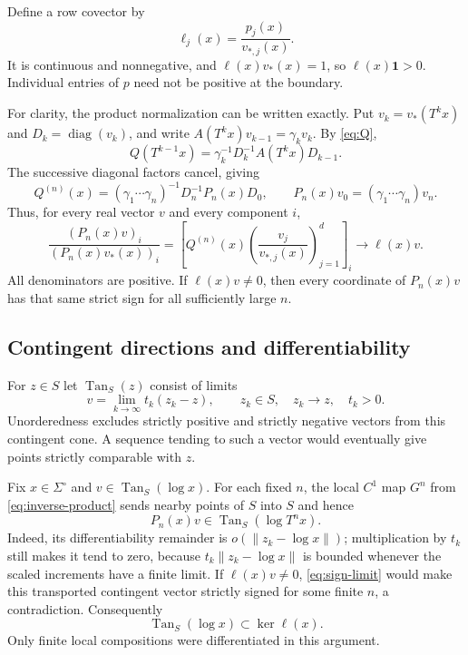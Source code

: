 \documentclass[11pt]{article}
\newcommand{\one}{\mathbf 1}
\newcommand{\diag}{\operatorname{diag}}
\newcommand{\Tan}{\operatorname{Tan}}
\begin{document}
Define a row covector by
\begin{equation}\label{eq:ell}
 \ell_j(x)=\frac{p_j(x)}{v_{*,j}(x)}.
\end{equation}
It is continuous and nonnegative, and
$\ell(x)v_*(x)=1$, so $\ell(x)\one>0$. Individual entries of $p$ need
not be positive at the boundary.

For clarity, the product normalization can be written exactly. Put
$v_k=v_*(T^kx)$ and $D_k=\diag(v_k)$, and write
$A(T^kx)v_{k-1}=\gamma_k v_k$. By \eqref{eq:Q},
\[
 Q(T^{k-1}x)=\gamma_k^{-1}D_k^{-1}A(T^kx)D_{k-1}.
\]
The successive diagonal factors cancel, giving
\[
 Q^{(n)}(x)=(\gamma_1\cdots\gamma_n)^{-1}
             D_n^{-1}P_n(x)D_0,
 \qquad P_n(x)v_0=(\gamma_1\cdots\gamma_n)v_n.
\]
Thus, for every real vector $v$ and every component $i$,
\begin{equation}\label{eq:sign-limit}
 \frac{(P_n(x)v)_i}{(P_n(x)v_*(x))_i}
 =\left[Q^{(n)}(x)
       \left(\frac{v_j}{v_{*,j}(x)}\right)_{j=1}^d\right]_i
 \longrightarrow\ell(x)v.
\end{equation}
All denominators are positive. If $\ell(x)v\ne0$, then every coordinate
of $P_n(x)v$ has that same strict sign for all sufficiently large $n$.

\subsection{Contingent directions and differentiability}

For $z\in S$ let $\Tan_S(z)$ consist of limits
\[
 v=\lim_{k\to\infty}t_k(z_k-z),\qquad
 z_k\in S,\quad z_k\to z,\quad t_k>0.
\]
Unorderedness excludes strictly positive and strictly negative vectors
from this contingent cone. A sequence tending to such a vector would
eventually give points strictly comparable with $z$.

Fix $x\in\Sigma^\circ$ and $v\in\Tan_S(\log x)$. For each fixed $n$,
the local $C^1$ map $G^n$ from \eqref{eq:inverse-product} sends nearby
points of $S$ into $S$ and hence
\[
 P_n(x)v\in\Tan_S(\log T^nx).
\]
Indeed, its differentiability remainder is $o(\|z_k-\log x\|)$;
multiplication by $t_k$ still makes it tend to zero, because
$t_k\|z_k-\log x\|$ is bounded whenever the scaled increments have a
finite limit. If $\ell(x)v\ne0$, \eqref{eq:sign-limit} would make this
transported contingent vector strictly signed for some finite $n$, a
contradiction. Consequently
\begin{equation}\label{eq:tangent}
 \Tan_S(\log x)\subset\ker\ell(x).
\end{equation}
Only finite local compositions were differentiated in this argument.
\end{document}
